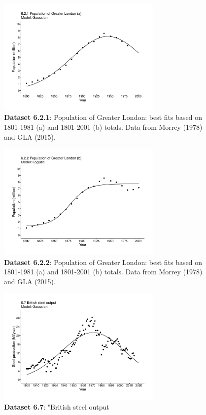 \documentclass[aps,rmp,preprint,superscriptaddress,10pt,onecolumn]{article}
\begin{document}
\begin{figure}[h]
\includegraphics[width=8cm]{output/figs-ggplot/6.2.1.pdf}
\caption{\textbf{Dataset 6.2.1}: Population of Greater London: best fits based on 1801-1981 (a) and 1801-2001 (b) totals. Data from Morrey (1978) and GLA (2015). }
\end{figure}
	
\begin{figure}[h]
\includegraphics[width=8cm]{output/figs-ggplot/6.2.2.pdf}
\caption{\textbf{Dataset 6.2.2}: Population of Greater London: best fits based on 1801-1981 (a) and 1801-2001 (b) totals. Data from Morrey (1978) and GLA (2015). }
\end{figure}
	
\begin{figure}[h]
\includegraphics[width=8cm]{output/figs-ggplot/6.7.pdf}
\caption{\textbf{Dataset 6.7}: "British steel output}
\end{figure}
	
\end{document}
